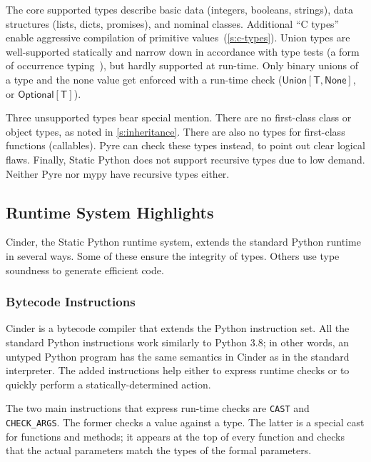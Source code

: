 \documentclass[english,cleveref,submission]{programming}
\newcommand{\SP}{Static Python}
\newcommand{\code}[1]{\texttt{#1}}
\newcommand{\typefont}[1]{\mathsf{#1}}
\newcommand{\paramtype}[2]{#1[#2]}
\newcommand{\sptype}{\typefont{T}}
\newcommand{\sptnone}{\typefont{None}}
\newcommand{\sptoptional}[1]{\paramtype{\typefont{Optional}}{#1}}
\newcommand{\sptunion}[1]{\paramtype{\typefont{Union}}{#1}}
\begin{document}
The core supported types describe basic data (integers, booleans, strings),
data structures (lists, dicts, promises),
and nominal classes.
Additional ``C types'' enable aggressive compilation of primitive
values~(\cref{s:c-types}).
Union types are well-supported statically and narrow down in accordance
with type tests (a form of occurrence typing~\cite{tf-icfp-2010,gsk-esop-2011}),
but hardly supported at run-time.
Only binary unions of a type and the none value get enforced with a run-time check
($\sptunion{\sptype, \sptnone}$, or $\sptoptional{\sptype}$).

Three unsupported types bear special mention.
There are no first-class class or object types, as noted in \cref{s:inheritance}.
There are also no types for first-class functions (callables).
Pyre can check these types instead, to point out clear logical flaws.
Finally, \SP{} does not support recursive types due to low demand.
Neither Pyre nor mypy have recursive types either.


\subsection{Runtime System Highlights}

Cinder, the \SP{} runtime system, extends the standard Python runtime in
several ways.
Some of these ensure the integrity of types.
Others use type soundness to generate efficient code.


\subsubsection{Bytecode Instructions}

Cinder is a bytecode compiler that extends the Python instruction set.
All the standard Python instructions work similarly to Python 3.8;
in other words, an untyped Python program has the same semantics in
Cinder as in the standard interpreter.
The added instructions help either to express runtime checks or to
quickly perform a statically-determined action.

The two main instructions that express run-time checks are \code{CAST}
and \code{CHECK\_ARGS}.
The former checks a value against a type.
The latter is a special cast for functions and methods;
it appears at the top of every function and checks that the
actual parameters match the types of the formal parameters.
\end{document}
